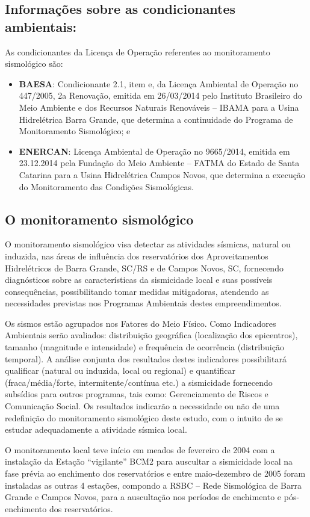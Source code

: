 \subsection{Informações sobre as condicionantes ambientais:}
As condicionantes da Licença de Operação referentes ao monitoramento sismológico são:
\begin{itemize}
    \item \textbf{BAESA}: Condicionante 2.1, item e, da Licença Ambiental de Operação no 447/2005, 2a Renovação, emitida em 26/03/2014 pelo Instituto Brasileiro do Meio Ambiente e dos Recursos Naturais Renováveis – IBAMA para a Usina Hidrelétrica Barra Grande, que determina a continuidade do Programa de Monitoramento Sismológico; e
    \item \textbf{ENERCAN}: Licença Ambiental de Operação no 9665/2014, emitida em 23.12.2014 pela Fundação do Meio Ambiente – FATMA do Estado de Santa Catarina para a Usina Hidrelétrica Campos Novos, que determina a execução do Monitoramento das Condições Sismológicas.
\end{itemize}

\subsection{O monitoramento sismológico}
\par{O monitoramento sismológico visa detectar as atividades sísmicas, natural ou induzida, nas áreas de influência dos reservatórios dos Aproveitamentos Hidrelétricos de Barra Grande, SC/RS e de Campos Novos, SC, fornecendo diagnósticos sobre as características da sismicidade local e suas possíveis consequências, possibilitando tomar medidas mitigadoras, atendendo as necessidades previstas nos Programas Ambientais destes empreendimentos.}
\par{Os sismos estão agrupados nos Fatores do Meio Físico. Como Indicadores Ambientais serão avaliados: distribuição geográfica (localização dos epicentros), tamanho (magnitude e intensidade) e frequência de ocorrência (distribuição temporal). A análise conjunta dos resultados destes indicadores possibilitará qualificar (natural ou induzida, local ou regional) e quantificar (fraca/média/forte, intermitente/contínua etc.) a sismicidade fornecendo subsídios para outros programas, tais como: Gerenciamento de Riscos e Comunicação Social. Os resultados indicarão a necessidade ou não de uma redefinição do monitoramento sismológico deste estudo, com o intuito de se estudar adequadamente a atividade sísmica local.}
\par{O monitoramento local teve início em meados de fevereiro de 2004 com a instalação da Estação “vigilante” BCM2 para auscultar a sismicidade local na fase  prévia ao enchimento dos reservatórios e entre maio-dezembro de 2005 foram instaladas as outras 4 estações, compondo a RSBC – Rede Sismológica de Barra Grande e Campos Novos, para a auscultação nos períodos de enchimento e pós-enchimento dos reservatórios.}

